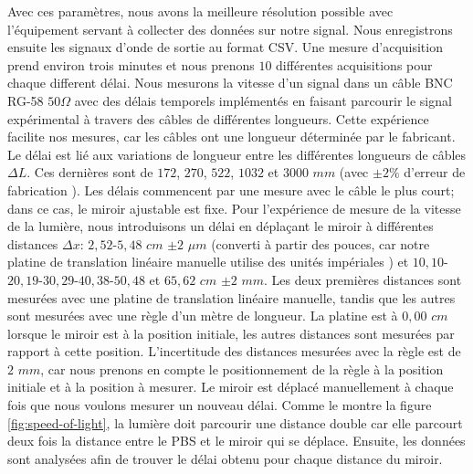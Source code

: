 \begin{onehalfspace}
    \noindent Avec ces paramètres, nous avons la meilleure résolution 
    possible avec l’équipement servant à collecter des données sur 
    notre signal. Nous enregistrons ensuite les signaux d’onde de 
    sortie au format \textsc{CSV}. Une mesure d'acquisition 
    prend environ trois minutes et
    nous prenons $10$ différentes acquisitions pour chaque different délai. 
    Nous mesurons la vitesse d'un signal dans un 
    câble BNC RG-58 $50 \Omega$ \cite{ThorlabsBNC} avec des délais temporels implémentés
    en faisant parcourir le signal expérimental à travers des câbles de
    différentes longueurs. Cette expérience 
    facilite nos mesures, car les câbles ont une longueur déterminée 
    par le fabricant. Le délai est lié aux variations de longueur entre 
    les différentes longueurs de câbles $\Delta L$. Ces dernières sont de 
    $172$, $270$, $522$, $1032$ et $3000$ $mm$ 
    (avec $\pm 2 \%$ d'erreur de fabrication \cite{ThorlabsBNC}). 
    Les délais 
    commencent par une mesure avec le câble le plus court; dans ce cas, le miroir ajustable est fixe. Pour 
    l'expérience de mesure de la vitesse de la lumière, nous introduisons
    un délai en déplaçant le miroir à différentes distances $\Delta x$: 
    $2,52$-$5,48$ $cm$ $\pm 2$ $\mu m$ (converti à partir des pouces, car 
    notre platine de translation linéaire manuelle utilise des unités 
    impériales \cite{EdmundOpticsStage}) et 
    $10,10$-$20,19$-$30,29$-$40,38$-$50,48$ et $65,62$ $cm$ $\pm 2$ $mm$.
    Les deux premières distances sont mesurées avec une platine de 
    translation linéaire manuelle, tandis que les autres sont mesurées
    avec une règle d’un mètre de longueur. La platine est à $0,00$ $cm$
    lorsque le miroir est à la position initiale, les autres distances sont
    mesurées par rapport à cette position. L'incertitude des distances mesurées
    avec la règle est de $2$ $mm$, car nous prenons en compte le
    positionnement de la règle à la position initiale et à la position à mesurer. 
    Le miroir est déplacé
    manuellement à chaque fois que nous voulons mesurer un nouveau délai.
    Comme le montre
    la figure \ref{fig:speed-of-light}, la lumière doit parcourir 
    une distance double car elle parcourt deux fois la 
    distance entre le PBS et le miroir qui se déplace. 
    Ensuite, les données sont analysées afin de 
    trouver le délai obtenu pour chaque distance du miroir.
    
\end{onehalfspace}
